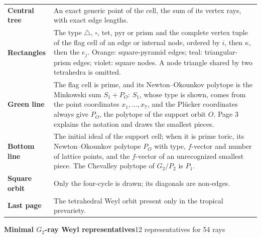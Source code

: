 \documentclass[14pt]{extarticle}
\begin{document}
\begin{atlasbox}
\begin{atlaspanel}
\begin{tabularx}{\linewidth}{@{}>{\bfseries}l@{\hspace{5mm}}X@{}}
Central tree & An exact generic point of the cell, the sum of its vertex
rays, with exact edge lengths.\\\noalign{\vspace{2mm}}
Rectangles & The type \(\triangle\), \(\square\), \(\mathrm{tet}\),
\(\mathrm{pyr}\) or \(\mathrm{prism}\) and the complete vertex tuple of the
flag cell of an edge or internal node, ordered by \(i\), then \(\kappa\),
then the \(e_j\).  Orange: square-pyramid edges; teal: triangular-prism edges;
violet: square nodes.  A node triangle shared by two tetrahedra is omitted.\\\noalign{\vspace{2mm}}
Green line & The flag cell is prime, and its Newton--Okounkov polytope is the
Minkowski sum \(S_1+P_O\): \(S_1\), whose type is shown, comes from the point
coordinates \(x_1,\ldots,x_7\), and the Pl\"ucker coordinates always give
\(P_O\), the polytope of the support orbit \(O\).  Page 3 explains the notation
and draws the smallest pieces.\\\noalign{\vspace{2mm}}
Bottom line & The initial ideal of the support cell; when it is prime toric,
its Newton--Okounkov polytope \(P_O\) with type, \(f\)-vector and number of
lattice points, and the \(f\)-vector of an unrecognized smallest
piece.  The Chevalley polytope of \(G_2/P_2\) is \(P_{1}\).\\\noalign{\vspace{2mm}}
Square orbit & Only the four-cycle is drawn; its diagonals are non-edges.\\\noalign{\vspace{2mm}}
Last page & The tetrahedral Weyl orbit present only in the tropical prevariety.
\end{tabularx}
\end{atlaspanel}
\end{atlasbox}
\clearpage
\vspace*{-7mm}
{\LARGE\bfseries Minimal $G_2$-ray Weyl representatives}\hfill{\small\color{muted}12 representatives for 54 rays}\par\vspace{-2mm}
\end{document}
